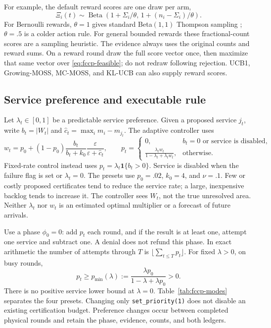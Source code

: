 \documentclass[11pt]{article}
\theoremstyle{remark}
\newcommand{\ind}{\mathbf 1}
\begin{document}
For example, the default reward scores are one draw per arm,
\begin{equation}\label{eq:fccp-score}
 \Xi_i(t)\sim\operatorname{Beta}
       (1+\Sigma_i/\theta,\,1+(n_i-\Sigma_i)/\theta).
\end{equation}
For Bernoulli rewards, $\theta=1$ gives standard Beta$(1,1)$ Thompson
sampling \citep{thompson1933}; $\theta=.5$ is a colder action rule.
For general bounded rewards these fractional-count scores are a
sampling heuristic. The evidence always uses the original counts and
reward sums. On a reward round draw the full score vector once, then
maximize that same vector over \eqref{eq:fccp-feasible}; do not redraw
following rejection. UCB1, Growing-MOSS, MC-MOSS, and KL-UCB can also
supply reward scores.

\subsection{Service preference and executable rule}\label{sec:fccp-modes}
Let $\lambda_t\in[0,1]$ be a predictable service preference. Given a
proposed service $j_t$, write $b_t=|W_t|$ and
$\widehat c_t=\max_i m_i-m_{j_t}$. The adaptive controller uses
\begin{equation}\label{eq:fccp-rate}
 w_t=p_0+(1-p_0)\frac{b_t}{b_t+k_0}
                         \frac{\varepsilon}{\varepsilon+\widehat c_t},
 \qquad
 p_t=\begin{cases}
 0,&b_t=0\text{ or service is disabled},\\
 \displaystyle\frac{\lambda_tw_t}{1-\lambda_t+\lambda_tw_t},&\text{otherwise}.
 \end{cases}
\end{equation}
Fixed-rate control instead uses $p_t=\lambda_t\ind\{b_t>0\}$.
Service is disabled when the failure flag is set or $\lambda_t=0$.
The presets use $p_0=.02$, $k_0=4$, and $\nu=.1$.
Few or costly proposed certificates tend to reduce the service rate;
a large, inexpensive backlog tends to increase it. The controller sees
$W_t$, not the true unresolved area. Neither $\lambda_t$ nor $w_t$ is
an estimated optimal multiplier or a forecast of future arrivals.

Use a phase $\phi_0=0$: add $p_t$ each round, and if the result is at
least one, attempt one service and subtract one. A denial does not
refund this phase. In exact arithmetic the number of attempts through
$T$ is $\lfloor\sum_{t\le T}p_t\rfloor$. For fixed $\lambda>0$,
on busy rounds,
\begin{equation}\label{eq:fccp-pmin}
 p_t\ge p_{\min}(\lambda):=
          \frac{\lambda p_0}{1-\lambda+\lambda p_0}>0.
\end{equation}
There is no positive service lower bound at $\lambda=0$.
Table~\ref{tab:fccp-modes} separates the four presets. Changing only
\texttt{set\_priority(1)} does not disable an existing certification
budget. Preference changes occur between completed physical rounds and
retain the phase, evidence, counts, and both ledgers.
\end{document}
